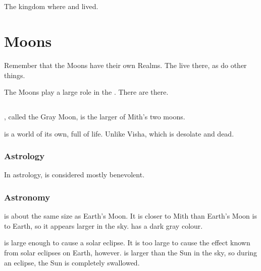 \section{\Imrath}
\label{\Imrath}
\index{\Imrath}
The kingdom where  and  lived.

















\section{Moons}
\label{Moons}
Remember that the Moons have their own Realms. The \moonwolves{} live there, as do other things. 

The Moons play a large role in the \feud. There are \nexi{} there.







\subsection{\Dun} 
\label{Dun}
\index{\Dun}
\Dun, called the Gray Moon, is the larger of Mith's two moons. 

\Dun{} is a world of its own, full of life. 
Unlike Visha, which is desolate and dead. 





\subsubsection{Astrology}
In astrology, \Dun{} is considered mostly benevolent. 





\subsubsection{Astronomy}
\Dun{} is about the same size as Earth's Moon. It is closer to Mith than Earth's Moon is to Earth, so it appears larger in the sky. \Dun{} has a dark gray colour. 

\Dun{} is large enough to cause a solar eclipse. It is too large to cause the  effect known from solar eclipses on Earth, however. \Dun{} is larger than the Sun in the sky, so during an eclipse, the Sun is completely swallowed. 


